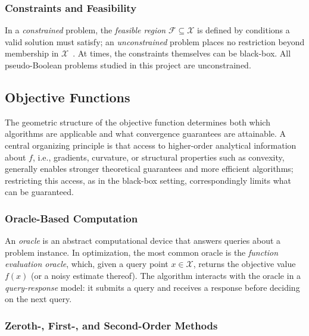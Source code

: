 \subsubsection{Constraints and Feasibility}

In a \textit{constrained} problem, the \textit{feasible region}
$\mathcal{F} \subseteq \mathcal{X}$ is defined by conditions a valid
solution must satisfy; an \textit{unconstrained} problem places no
restriction beyond membership in $\mathcal{X}$~\cite{nocedal2006numerical}.
At times, the constraints themselves can be black-box.
All pseudo-Boolean problems studied in this project are unconstrained.

\subsection{Objective Functions}

The geometric structure of the objective function determines both
which algorithms are
applicable and what convergence guarantees are attainable. A central organizing
principle is that access to higher-order analytical information about
$f$, i.e., gradients,
curvature, or structural properties such as convexity, generally
enables stronger
theoretical guarantees and more efficient algorithms; restricting this access,
as in the black-box setting, correspondingly limits what can be guaranteed.

\subsubsection{Oracle-Based Computation}
\label{subsubsec:oraclecomp}

An \textit{oracle} is an abstract computational device that answers
queries about a
problem instance. In optimization, the most common oracle is the
\textit{function
evaluation oracle}, which, given a query point $x \in \mathcal{X}$, returns the
objective value $f(x)$ (or a noisy estimate thereof). The algorithm
interacts with the
oracle in a \textit{query-response} model: it submits a query and
receives a response
before deciding on the next query.

\subsubsection{Zeroth-, First-, and Second-Order Methods}
\label{subsubsec:order-methods}

